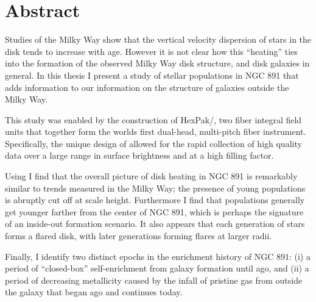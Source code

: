 \chapter*{Abstract}

Studies of the Milky Way show that the vertical velocity dispersion of
stars in the disk tends to increase with age. However it is not clear
how this ``heating'' ties into the formation of the observed Milky Way
disk structure, and disk galaxies in general. In this thesis I present
a study of stellar populations in NGC 891 that adds information to our
information on the structure of galaxies outside the Milky Way.

This study was enabled by the construction of HexPak/\GP, two fiber
integral field units that together form the worlds first dual-head,
multi-pitch fiber instrument. Specifically, the unique design of \GP
allowed for the rapid collection of high quality data over a large
range in surface brightness and at a high filling factor. 

Using \GP I find that the overall picture of disk heating in NGC 891
is remarkably similar to trends measured in the Milky Way; the
presence of young populations is abruptly cut off at  scale
height. Furthermore I find that populations generally get younger
farther from the center of NGC 891, which is perhaps the signature of
an inside-out formation scenario. It also appears that each generation
of stars forms a flared disk, with later generations forming flares at
larger radii.

Finally, I identify two distinct epochs in the enrichment history of
NGC 891: (i) a period of ``closed-box'' self-enrichment from galaxy
formation until  ago, and (ii) a period of
decreasing metallicity caused by the infall of pristine gas from
outside the galaxy that began  ago and continues today.
